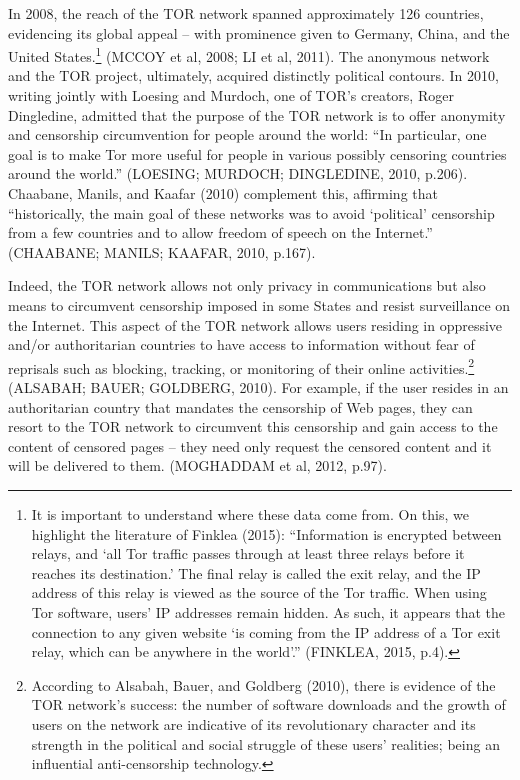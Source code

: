 In 2008, the reach of the TOR network spanned approximately 126 countries, evidencing its global appeal -- with prominence given to Germany, China, and the United States.\footnote{It is important to understand where these data come from. On this, we highlight the literature of Finklea (2015): ``Information is encrypted between relays, and `all Tor traffic passes through at least three relays before it reaches its destination.' The final relay is called the exit relay, and the IP address of this relay is viewed as the source of the Tor traffic. When using Tor software, users' IP addresses remain hidden. As such, it appears that the connection to any given website `is coming from the IP address of a Tor exit relay, which can be anywhere in the world'.'' (FINKLEA, 2015, p.4).} (MCCOY et al, 2008; LI et al, 2011). The anonymous network and the TOR project, ultimately, acquired distinctly political contours. In 2010, writing jointly with Loesing and Murdoch, one of TOR's creators, Roger Dingledine, admitted that the purpose of the TOR network is to offer anonymity and censorship circumvention for people around the world: ``In particular, one goal is to make Tor more useful for people in various possibly censoring countries around the world.'' (LOESING; MURDOCH; DINGLEDINE, 2010, p.206). Chaabane, Manils, and Kaafar (2010) complement this, affirming that ``historically, the main goal of these networks was to avoid `political' censorship from a few countries and to allow freedom of speech on the Internet.'' (CHAABANE; MANILS; KAAFAR, 2010, p.167).

Indeed, the TOR network allows not only privacy in communications but also means to circumvent censorship imposed in some States and resist surveillance on the Internet. This aspect of the TOR network allows users residing in oppressive and/or authoritarian countries to have access to information without fear of reprisals such as blocking, tracking, or monitoring of their online activities.\footnote{According to Alsabah, Bauer, and Goldberg (2010), there is evidence of the TOR network's success: the number of software downloads and the growth of users on the network are indicative of its revolutionary character and its strength in the political and social struggle of these users' realities; being an influential anti-censorship technology.} (ALSABAH; BAUER; GOLDBERG, 2010). For example, if the user resides in an authoritarian country that mandates the censorship of Web pages, they can resort to the TOR network to circumvent this censorship and gain access to the content of censored pages -- they need only request the censored content and it will be delivered to them. (MOGHADDAM et al, 2012, p.97).

